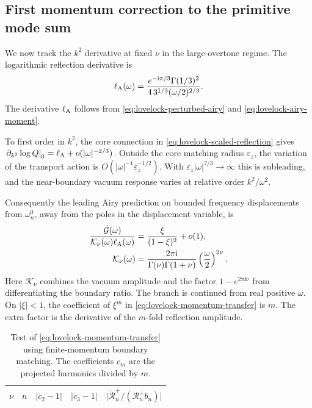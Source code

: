 \subsection{First momentum correction to the primitive mode sum}
\label{sec:lovelock-momentum-time}

We now track the \(k^2\) derivative at fixed \(\nu\) in the
large-overtone regime. The logarithmic reflection derivative is
\begin{equation}
 \ell_{\rm A}(\omega)=
 \frac{e^{-\mathrm{i}\pi/3}\Gamma(1/3)^2}
 {4\,3^{1/3}(\omega/2)^{2/3}} .
 \label{eq:lovelock-momentum-symbol}
\end{equation}
The derivative \(\ell_{\rm A}\) follows from
\eqref{eq:lovelock-perturbed-airy} and
\eqref{eq:lovelock-airy-moment}.

To first order in \(k^2\), the core connection in
\eqref{eq:lovelock-scaled-reflection} gives
\(\left.\partial_{k^2}\log Q\right|_{0}
 =\ell_{\rm A}+o(|\omega|^{-2/3})\).
Outside the core matching radius \(\varepsilon_z\),
the variation of the transport action is
\(O(|\omega|^{-1}\varepsilon_z^{-1/2})\).
With \(\varepsilon_z|\omega|^{2/3}\to\infty\) this is
subleading, and the near-boundary vacuum response varies
at relative order \(k^2/\omega^2\).

Consequently the leading Airy prediction on bounded
frequency displacements from \(\omega_n^0\), away from
the poles in the displacement variable, is
\begin{align}
 \frac{\dot{\mathcal G}(\omega)}
      {\mathcal K_\nu(\omega)\ell_{\rm A}(\omega)}
 &=\frac{\xi}{(1-\xi)^2}+o(1),\notag\\
 \mathcal K_\nu(\omega)
 &=\frac{2\pi\mathrm{i}}{\Gamma(\nu)\Gamma(1+\nu)}
                      \left(\frac{\omega}{2}\right)^{2\nu}.
 \label{eq:lovelock-momentum-transfer}
\end{align}
Here \(\mathcal K_\nu\) combines the vacuum amplitude
and the factor \(1-e^{2\pi\ii\nu}\) from differentiating
the boundary ratio. The branch is continued from real
positive \(\omega\). On \(|\xi|<1\), the coefficient of
\(\xi^m\) in \eqref{eq:lovelock-momentum-transfer} is \(m\).
The extra factor is the derivative of the \(m\)-fold
reflection amplitude.

\begin{table}[t]
 \centering\small
 \begin{tabular}{ccccc}
 \hline
 \(\nu\) & \(n\) & \(\lvert c_2-1\rvert\) & \(\lvert c_3-1\rvert\) &
   \(\lvert\dot{\mathcal R}_n^+/(\mathcal R_n^+b_n)\rvert\) \\
 \hline
 
 \end{tabular}
 \caption{Test of \eqref{eq:lovelock-momentum-transfer} using
 finite-momentum boundary matching. The coefficients \(c_m\)
 are the projected harmonics divided by \(m\).}
 \label{tab:lovelock-momentum-harmonics}
\end{table}

